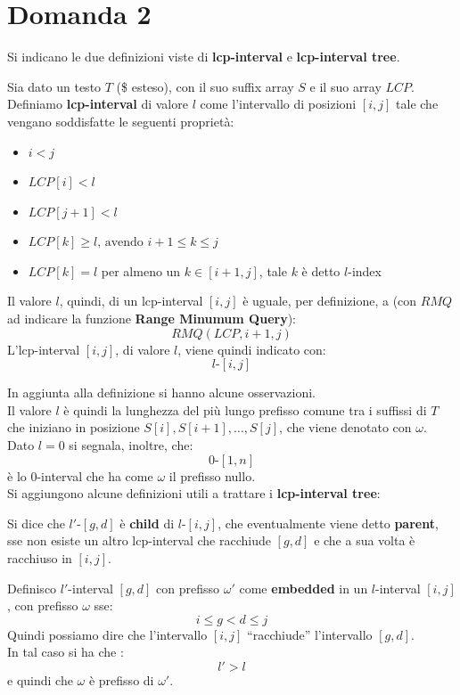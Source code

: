 \documentclass[a4paper,12pt, oneside]{book}
\begin{document}
\section{Domanda 2}
Si indicano le due definizioni viste di \textbf{lcp-interval} e
\textbf{lcp-interval tree}.
\begin{definizione}
  Sia dato un testo $T$ (\$ esteso), con il suo suffix array $S$ e il suo array
  $LCP$.\\ 
  Definiamo \textbf{lcp-interval} di valore $l$ come l'intervallo di
  posizioni $[i,j]$ tale che vengano soddisfatte le seguenti proprietà:
  \begin{itemize}
    \item $i< j$
    \item $LCP[i]<l$
    \item $LCP[j+1]<l$
    \item $LCP[k]\geq l\mbox{, avendo } i+1\leq k\leq j$
    \item $LCP[k]=l$ per almeno un $k\in[i+1,j]$, tale $k$ è detto
    $l$-index 
  \end{itemize}
  Il valore $l$, quindi, di un lcp-interval $[i,j]$ è uguale, per definizione, a
  (con $RMQ$ ad indicare la funzione \textbf{Range Minumum Query}):
  \[RMQ(LCP, i+1,j)\]
  L'lcp-interval $[i,j]$, di valore $l$, viene quindi indicato con:
  \[l\mbox{-}[i,j]\]
\end{definizione}
In aggiunta alla definizione si hanno alcune osservazioni.\\
Il valore $l$ è quindi la lunghezza del più lungo prefisso comune tra i
suffissi di $T$ che iniziano in posizione $S[i], S[i+1], \ldots, S[j]$, che
viene denotato con $\omega$.\\
Dato $l=0$ si segnala, inoltre, che:
\[0\mbox{-}[1,n]\]
è lo 0-interval che ha come $\omega$ il prefisso nullo.\\
Si aggiungono alcune definizioni utili a trattare i
\textbf{lcp-interval tree}:
\begin{definizione}
  Si dice che $l'$-$[g,d]$ è \textbf{child} di $l$-$[i,j]$, che eventualmente
  viene detto \textbf{parent}, sse non esiste un
  altro lcp-interval che racchiude $[g,d]$ e che a sua volta è racchiuso in
  $[i,j]$.
\end{definizione}
\begin{definizione}
  Definisco $l'$-interval $[g,d]$ con prefisso $\omega'$ come \textbf{embedded}
  in un $l$-interval $[i,j]$, con prefisso $\omega$ sse:
  \[i\leq g<d\leq j\]
  Quindi possiamo dire che l'intervallo $[i,j]$ ``racchiude'' l'intervallo
  $[g,d]$.\\ 
  In tal caso si ha che :
  \[l'>l\]
  e quindi che $\omega$ è prefisso di $\omega'$.
\end{definizione}
\end{document}
